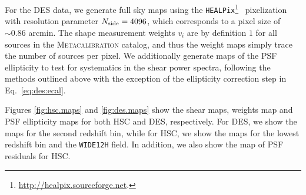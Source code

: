 \documentclass[a4paper,11pt]{article}
\newcommand{\Nside}{N_{\rm side}}
\newcommand{\mcal}{\textsc{Metacalibration}}
\begin{document}
      For the DES data, we generate full sky maps using the \texttt{HEALPix}\footnote{\url{http://healpix.sourceforge.net}.}~\cite{astro-ph/0409513} pixelization with resolution parameter $\Nside = 4096$, which corresponds to a pixel size of $\sim0.86$ arcmin. The shape measurement weights $v_i$ are by definition $1$ for all sources in the \mcal{} catalog, and thus the weight maps simply trace the number of sources per pixel. We additionally generate maps of the PSF ellipticity to test for systematics in the shear power spectra, following the methods outlined above with the exception of the ellipticity correction step in Eq.~\ref{eq:des:ecal}.

      Figures \ref{fig:hsc.maps} and \ref{fig:des.maps} show the shear maps, weights map and PSF ellipticity maps for both HSC and DES, respectively. For DES, we show the maps for the second redshift bin, while for HSC, we show the maps for the lowest redshift bin and the \texttt{WIDE12H} field. In addition, we also show the map of PSF residuals for HSC.
\end{document}
